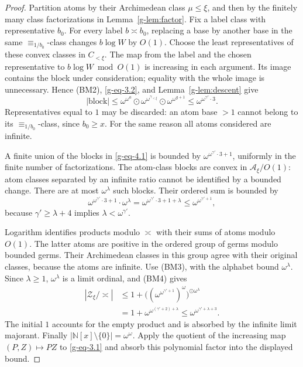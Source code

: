 \documentclass[11pt]{article}
\theoremstyle{definition}
\theoremstyle{remark}
\newcommand{\N}{\mathbb N}
\newcommand{\arch}{\mathrel{\asymp}}
\newcommand{\od}{\mathbin{\odot}}
\newcommand{\Acal}{\mathcal A}
\newcommand{\Zcal}{\mathcal Z}
\numberwithin{equation}{section}
\begin{document}
\begin{proof}
Partition atoms by their Archimedean class $\mu\le\xi$, and then by
the finitely many class factorizations in Lemma~\ref{g-lem:factor}.
Fix a label class with representative $b_0$.
For every label $b\arch b_0$, replacing a base by another base in
the same $\equiv_{1/b_0}$-class changes $b\log W$ by $O(1)$.
Choose the least representatives of these convex classes in
$C_{<\xi}$.  The map from the label and the chosen representative
to $b\log W\bmod O(1)$ is increasing in each argument.
Its image contains the block under consideration; equality with the
whole image is unnecessary.  Hence (BM2), \eqref{g-eq-3.2}, and
Lemma~\ref{g-lem:descent} give
\begin{equation}
 |\text{block}|
 \le\omega^{\omega^a}\od
      \omega^{\omega^{\gamma_{<\xi}}}\od
      \omega^{\omega^{g+1}}
 \le\omega^{\omega^{\gamma'}\cdot3}.
 \label{g-eq-4.1}
\end{equation}
Representatives equal to $1$ may be discarded: an atom base $>1$
cannot belong to its $\equiv_{1/b_0}$-class, since $b_0\ge x$.
For the same reason all atoms considered are infinite.

A finite union of the blocks in \eqref{g-eq-4.1} is bounded by
$\omega^{\omega^{\gamma'}\cdot3+1}$, uniformly in the finite number
of factorizations.  The atom-class blocks are convex in
$\Acal_\xi/O(1)$: atom classes separated by an infinite ratio
cannot be identified by a bounded change.
There are at most $\omega^\lambda$ such blocks.  Their ordered sum
is bounded by
\[
 \omega^{\omega^{\gamma'}\cdot3+1}\cdot\omega^\lambda
 =\omega^{\omega^{\gamma'}\cdot3+1+\lambda}
 \le\omega^{\omega^{\gamma'+1}},
\]
because $\gamma'\ge\lambda+4$ implies $\lambda<\omega^{\gamma'}$.

Logarithm identifies products modulo $\arch$ with their sums of atoms
modulo $O(1)$.  The latter atoms are positive in the ordered group
of germs modulo bounded germs.  Their Archimedean classes in this
group agree with their original classes, because the atoms are infinite.
Use (BM3), with the alphabet bound $\omega^\lambda$.
Since $\lambda\ge1$, $\omega^\lambda$ is a limit ordinal, and (BM4)
gives
\[
 \begin{aligned}
 |\Zcal_\xi/\arch|
 &\le 1+
  \bigl((\omega^{\omega^{\gamma'+1}})^\omega
                \bigr)^{\od\omega^\lambda}\\
 &=1+\omega^{\omega^{(\gamma'+2)+\lambda}}
 \le\omega^{\omega^{\gamma'+\lambda+3}}.
 \end{aligned}
\]
The initial $1$ accounts for the empty product and is absorbed by
the infinite limit majorant.
Finally $|\N[x]\setminus\{0\}|=\omega^\omega$.
Apply the quotient of the increasing map $(P,Z)\mapsto PZ$
to \eqref{g-eq-3.1} and absorb this polynomial factor into the displayed bound.
\end{proof}
\end{document}
